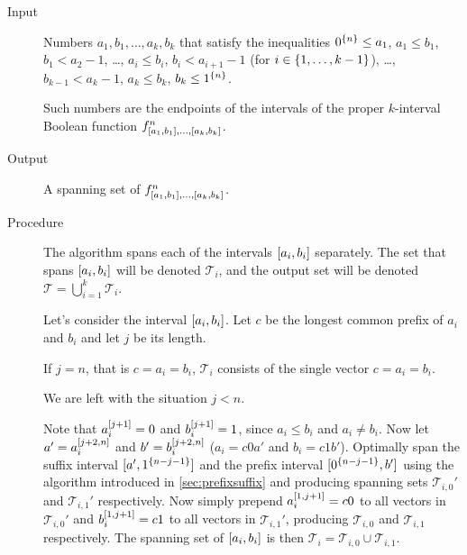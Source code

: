 \begin{description}
\item[Input] Numbers $a_1, b_1, \ldots, a_k, b_k$
that satisfy the inequalities
$0^{\{n\}} \leq a_1$,
$a_1 \leq b_1$,
$b_1 < a_2 - 1$,
\ldots,
$a_i \leq b_i$,
$b_i < a_{i+1} - 1$
(for $i \in \{1, \ldots, k-1\}$),
\ldots,
$b_{k-1} < a_k - 1$,
$a_k \leq b_k$,
$b_k \leq 1^{\{n\}}$.

Such numbers are the endpoints of the intervals
of the proper $k$-interval Boolean function $f^{n}_{[a_1, b_1], \ldots, [a_{k}, b_{k}]}$.

\item[Output] A spanning set of $f^{n}_{[a_1, b_1], \ldots, [a_{k}, b_{k}]}$.

\item[Procedure]
The algorithm spans each of
the intervals $[a_i, b_i]$ separately.
The set that spans $[a_i, b_i]$ will be denoted
$\mathcal{T}_i$,
and the output set will be denoted
$\mathcal{T} = \bigcup_{i=1}^k{\mathcal{T}_i}$.

Let's consider the interval $[a_i, b_i]$.
Let $c$ be the longest common prefix of $a_i$ and $b_i$
and let $j$ be its length.

If $j = n$, that is $c = a_i = b_i$,
$\mathcal{T}_i$ consists of the single vector
$c = a_i = b_i$.

We are left with the situation $j < n$.

Note that $a_i^{[j+1]} = 0$ and $b_i^{[j+1]} = 1$,
since $a_i \leq b_i$ and $a_i \neq b_i$.
Now let $a' = a_i^{[j+2, n]}$
and $b' = b_i^{[j+2, n]}$
($a_i = c 0 a'$ and $b_i = c 1 b'$).
Optimally span the suffix interval
$[a', 1^{\{n-j-1\}}]$
and the prefix interval
$[0^{\{n-j-1\}}, b']$
using the
algorithm
introduced in \cref{sec:prefixsuffix}
and producing spanning sets
$\mathcal{T}_{i, 0}'$
and $\mathcal{T}_{i, 1}'$ respectively.
Now simply prepend $a_i^{[1, j+1]} = c 0$
to all vectors in $\mathcal{T}_{i, 0}'$
and $b_i^{[1, j+1]} = c 1$
to all vectors in $\mathcal{T}_{i, 1}'$,
producing $\mathcal{T}_{i, 0}$
and $\mathcal{T}_{i, 1}$ respectively.
The spanning set of $[a_i, b_i]$
is then
$\mathcal{T}_i
= \mathcal{T}_{i, 0} \cup \mathcal{T}_{i, 1}$.
\end{description}


